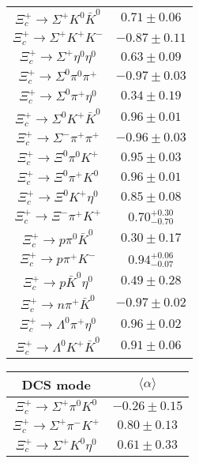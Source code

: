 \begin{table}
{\begin{tabular}{|c|c|}
			$\Xi_{c}^{+} \to  \Sigma^{+} K^{0} \bar{K}^{0} $ & $       0.71 \pm       0.06 $ \\
			$\Xi_{c}^{+} \to  \Sigma^{+} K^{+} K^{-} $ & $      -0.87 \pm       0.11 $ \\
			$\Xi_{c}^{+} \to  \Sigma^{+} \eta^{0} \eta^{0} $ & $       0.63 \pm       0.09 $ \\
			$\Xi_{c}^{+} \to  \Sigma^{0} \pi^{0} \pi^{+} $ & $      -0.97 \pm       0.03 $ \\
			$\Xi_{c}^{+} \to  \Sigma^{0} \pi^{+} \eta^{0} $ & $       0.34 \pm       0.19 $ \\
			$\Xi_{c}^{+} \to  \Sigma^{0} K^{+} \bar{K}^{0} $ & $       0.96 \pm       0.01 $ \\
			$\Xi_{c}^{+} \to \Sigma^{-} \pi^{+} \pi^{+} $ & $      -0.96 \pm       0.03 $ \\
			$\Xi_{c}^{+} \to  \Xi^{0} \pi^{0} K^{+} $ & $       0.95 \pm       0.03 $ \\
			$\Xi_{c}^{+} \to  \Xi^{0} \pi^{+} K^{0} $ & $       0.96 \pm       0.01 $ \\
			$\Xi_{c}^{+} \to  \Xi^{0} K^{+} \eta^{0} $ & $       0.85 \pm       0.08 $ \\
			$\Xi_{c}^{+} \to  \Xi^{-} \pi^{+} K^{+} $ & $       0.70^{+0.30}_{-0.70} $ \\
			$\Xi_{c}^{+} \to  p \pi^{0} \bar{K}^{0} $ & $       0.30 \pm       0.17 $ \\
			$\Xi_{c}^{+} \to  p \pi^{+} K^{-} $ & $       0.94 ^{+0.06}_{-0.07} $ \\
			$\Xi_{c}^{+} \to  p \bar{K}^{0} \eta^{0} $ & $       0.49 \pm       0.28 $ \\
			$\Xi_{c}^{+} \to  n \pi^{+} \bar{K}^{0} $ & $      -0.97 \pm       0.02 $ \\
			$\Xi_{c}^{+} \to  \Lambda^{0} \pi^{+} \eta^{0} $ & $       0.96 \pm       0.02 $ \\
			$\Xi_{c}^{+} \to \Lambda^{0} K^{+} \bar{K}^{0} $ & $       0.91 \pm       0.06 $ \\
			\hline
		\end{tabular}
		\begin{tabular}{|c|c|}
			\hline
			DCS mode& $\langle \alpha \rangle$\\
			\hline
			$\Xi_{c}^{+} \to  \Sigma^{+} \pi^{0} K^{0} $ & $      -0.26 \pm       0.15 $ \\
			$\Xi_{c}^{+} \to  \Sigma^{+} \pi^{-} K^{+} $ & $       0.80 \pm       0.13 $ \\
			$\Xi_{c}^{+} \to  \Sigma^{+} K^{0} \eta^{0} $ & $       0.61 \pm       0.33 $ \\

\end{tabular}}
\end{table}
